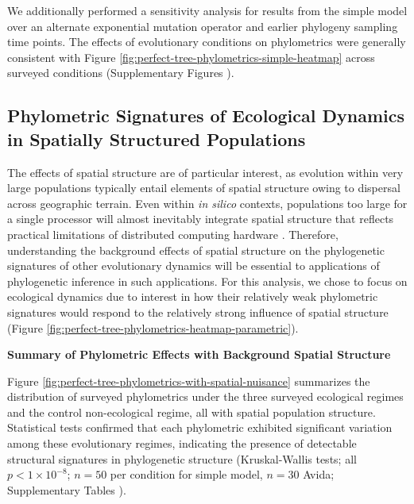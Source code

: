 We additionally performed a sensitivity analysis for results from the simple model over an alternate exponential mutation operator and earlier phylogeny sampling time points.
The effects of evolutionary conditions on phylometrics were generally consistent with Figure \ref{fig:perfect-tree-phylometrics-simple-heatmap} across surveyed conditions (Supplementary Figures ).

\subsection{Phylometric Signatures of Ecological Dynamics in Spatially Structured Populations}



The effects of spatial structure are of particular interest, as evolution within very large populations typically entail elements of spatial structure owing to dispersal across geographic terrain.
Even within \textit{in silico} contexts, populations too large for a single processor will almost inevitably integrate spatial structure that reflects practical limitations of distributed computing hardware \citep{ackley2014indefinitely,moreno2021conduit}.
Therefore, understanding the background effects of spatial structure on the phylogenetic signatures of other evolutionary dynamics will be essential to applications of phylogenetic inference in such applications.
For this analysis, we chose to focus on ecological dynamics due to interest in how their relatively weak phylometric signatures would respond to the relatively strong influence of spatial structure (Figure \ref{fig:perfect-tree-phylometrics-heatmap-parametric}).

\textbf{Summary of Phylometric Effects with Background Spatial Structure}



Figure \ref{fig:perfect-tree-phylometrics-with-spatial-nuisance} summarizes the distribution of surveyed phylometrics under the three surveyed ecological regimes and the control non-ecological regime, all with spatial population structure.
Statistical tests confirmed that each phylometric exhibited significant variation among these evolutionary regimes, indicating the presence of detectable structural signatures in phylogenetic structure (Kruskal-Wallis tests; all $p < 1\times10^{-8}$; $n=50$ per condition for simple model, $n=30$ Avida; Supplementary Tables ).

